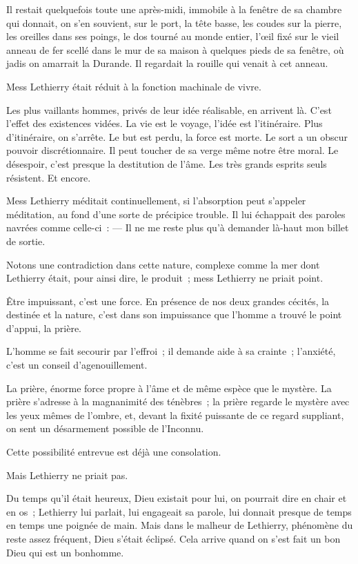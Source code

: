 \documentclass[french,twoside]{book} %
\begin{document}
Il restait quelquefois toute une après-midi, immobile à la fenêtre de sa chambre qui donnait, on s’en souvient, sur le port, la tête basse, les coudes sur la pierre, les oreilles dans ses poings, le dos tourné au monde entier, l’œil fixé sur le vieil anneau de fer scellé dans le mur de sa maison à quelques pieds de sa fenêtre, où jadis on amarrait la Durande. Il regardait la rouille qui venait à cet anneau.\par
Mess Lethierry était réduit à la fonction machinale de vivre.\par
Les plus vaillants hommes, privés de leur idée réalisable, en arrivent là. C’est l’effet des existences vidées. La vie est le voyage, l’idée est l’itinéraire. Plus d’itinéraire, on s’arrête. Le but est perdu, la force est morte. Le sort a un obscur pouvoir discrétionnaire. Il peut toucher de sa verge même notre être moral. Le désespoir, c’est presque la destitution de l’âme. Les très grands esprits seuls résistent. Et encore.\par
Mess Lethierry méditait continuellement, si l’absorption peut s’appeler méditation, au fond d’une sorte de précipice trouble. Il lui échappait des paroles navrées  comme celle-ci : — Il ne me reste plus qu’à demander là-haut mon billet de sortie.\par
Notons une contradiction dans cette nature, complexe comme la mer dont Lethierry était, pour ainsi dire, le produit ; mess Lethierry ne priait point.\par
Être impuissant, c’est une force. En présence de nos deux grandes cécités, la destinée et la nature, c’est dans son impuissance que l’homme a trouvé le point d’appui, la prière.\par
L’homme se fait secourir par l’effroi ; il demande aide à sa crainte ; l’anxiété, c’est un conseil d’agenouillement.\par
La prière, énorme force propre à l’âme et de même espèce que le mystère. La prière s’adresse à la magnanimité des ténèbres ; la prière regarde le mystère avec les yeux mêmes de l’ombre, et, devant la fixité puissante de ce regard suppliant, on sent un désarmement possible de l’Inconnu.\par
Cette possibilité entrevue est déjà une consolation.\par
Mais Lethierry ne priait pas.\par
Du temps qu’il était heureux, Dieu existait pour lui, on pourrait dire en chair et en os ; Lethierry lui parlait, lui engageait sa parole, lui donnait presque de temps en temps une poignée de main. Mais dans le malheur de Lethierry, phénomène du reste assez fréquent, Dieu s’était éclipsé. Cela arrive quand on s’est fait un bon Dieu qui est un bonhomme.\par
\end{document}
